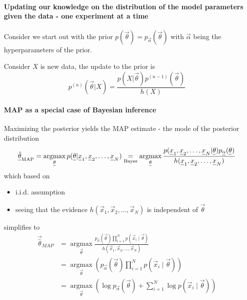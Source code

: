 \paragraph*{Updating our knowledge on the distribution of the model parameters given the data - one experiment at a time}
Consider we start out with the prior $p(\vec{\theta}) = p_{\vec{\alpha}}(\vec{\theta})$ with $\vec{\alpha}$ being the hyperparameters of
the prior.

Consider $X$ is new data, the update to the prior is
\begin{equation}
    p^{(n)}(\vec{\theta} | X) = \frac{p(X | \vec{\theta}) p^{(n-1)}(\vec{\theta})}{h(X)}
\end{equation}

\paragraph*{MAP as a special case of Bayesian inference}
Maximizing the posterior yields the MAP estimate - the mode of the posterior distribution
\begin{equation}
    \vec{\hat{\theta}}_{\text{MAP}} = \argmax_{\vec{\theta}} p(\vec{\theta} | \vec{x}_1, \vec{x}_2, \ldots, \vec{x}_N) \underset{\text{Bayes}}{=} \argmax_{\vec{\theta}} \frac{p(\vec{x}_1, \vec{x}_2, \ldots, \vec{x}_N | \vec{\theta}) p_{\vec{\alpha}}(\vec{\theta})}{h(\vec{x}_1, \vec{x}_2, \ldots, \vec{x}_N)}
\end{equation}
which based on
\begin{itemize}
    \item i.i.d. assumption
    \item seeing that the evidence $h(\vec{x}_1, \vec{x}_2, \ldots, \vec{x}_N)$ is independent of $\vec{\theta}$
\end{itemize}
simplifies to
\begin{equation}
    \boxed{
    \begin{aligned}
    \vec{\hat{\theta}}_{M A P}&=\underset{\vec{\theta}}{\operatorname{argmax}} \frac{p_{\vec{\alpha}}(\vec{\theta}) \prod_{i=1}^N p\left(\vec{x}_i \mid \vec{\theta}\right)}{h\left(\vec{x}_1, \vec{x}_2, \ldots, \vec{x}_N\right)}\\
    &=\underset{\vec{\theta}}{\operatorname{argmax}}\left(p_{\vec{\alpha}}(\vec{\theta}) \prod_{i=1}^N p\left(\vec{x}_i \mid \vec{\theta}\right)\right) \\
    &=\underset{\vec{\theta}}{\operatorname{argmax}}\left(\log p_{\vec{\alpha}}(\vec{\theta})+\sum_{i=1}^N \log p\left(\vec{x}_i \mid \vec{\theta}\right)\right)
    \end{aligned}}
\end{equation}

